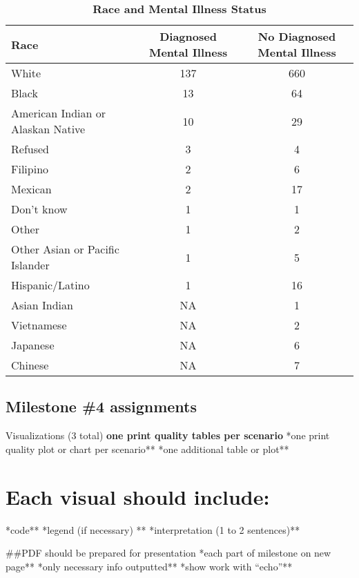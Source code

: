 \documentclass[
]{article}
\begin{document}
\begin{table}[H]

\caption{\label{tab:importing data for reference}\textbf{Race and Mental Illness Status}}
\centering
\begin{tabular}[t]{lcc}
\toprule
Race & Diagnosed Mental Illness & No Diagnosed Mental Illness\\
\midrule
White & 137 & 660\\
Black & 13 & 64\\
American Indian or Alaskan Native & 10 & 29\\
Refused & 3 & 4\\
Filipino & 2 & 6\\
\addlinespace
Mexican & 2 & 17\\
Don't know & 1 & 1\\
Other & 1 & 2\\
Other Asian or Pacific Islander & 1 & 5\\
Hispanic/Latino & 1 & 16\\
\addlinespace
Asian Indian & NA & 1\\
Vietnamese & NA & 2\\
Japanese & NA & 6\\
Chinese & NA & 7\\
\bottomrule
\end{tabular}
\end{table}

\newpage

\hypertarget{milestone-4-assignments}{%
\subsection{Milestone \#4 assignments}\label{milestone-4-assignments}}

Visualizations (3 total) \textbf{one print quality tables per scenario}
\newline **one print quality plot or chart per scenario** \newline **one
additional table or plot**

\hypertarget{each-visual-should-include}{%
\section{Each visual should include:}\label{each-visual-should-include}}

\newline **code** \newline **legend (if necessary) **
\newline **interpretation (1 to 2 sentences)**

\#\#PDF should be prepared for presentation \newline**each part of
milestone on new page** \newline**only necessary info outputted**
\newline **show work with ``echo''**
\end{document}
